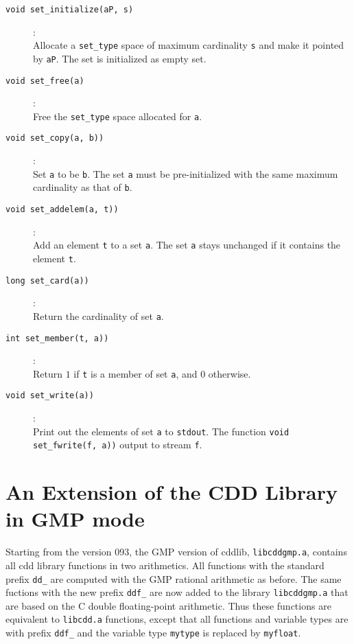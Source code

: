 \documentclass[11pt]{article}
\newcommand {\0} {{\bf 0}}
\begin{document}
\begin{description}

\item[{\tt void set\_initialize(aP, s)}]:\\
Allocate a {\tt set\_type} space of maximum cardinality {\tt s}
 and make it pointed by {\tt aP}.  The set is initialized as empty set.

\item[{\tt void set\_free(a)}]:\\
Free the  {\tt set\_type} space allocated for {\tt a}.

\item[{\tt void set\_copy(a, b))}]:\\
Set {\tt a} to be {\tt b}.   The set {\tt a} must be pre-initialized
with the same maximum cardinality as that of {\tt b}.  

\item[{\tt void set\_addelem(a, t))}]:\\
Add an element  {\tt t} to a set {\tt a}.    The set  {\tt a} stays unchanged
if it contains the element {\tt t}.

\item[{\tt long set\_card(a))}]:\\
Return the cardinality of set {\tt a}. 

\item[{\tt int set\_member(t, a))}]:\\
Return $1$ if  {\tt t} is a member of set {\tt a}, and $0$ otherwise.


\item[{\tt void set\_write(a))}]:\\
Print out the elements of set {\tt a} to {\tt stdout}.  The function {\tt void set\_fwrite(f, a))} output
to stream {\tt f}.

\end{description}

\section{An Extension of the CDD Library in GMP mode}  \label{GMPLIB}

Starting from the version 093, the GMP version of cddlib, {\tt libcddgmp.a}, contains
all cdd library functions in two arithmetics.   All functions with the standard prefix {\tt dd\_}
are computed with the GMP rational arithmetic as before.  The same fuctions with
the new prefix {\tt ddf\_} are now added to the library  {\tt libcddgmp.a} that are based
on the C  double floating-point arithmetic.  Thus these functions are equivalent to
 {\tt libcdd.a} functions, except that all functions and  variable types are with prefix  {\tt ddf\_} and
the variable type {\tt mytype} is replaced by {\tt myfloat}.
\end{document}
